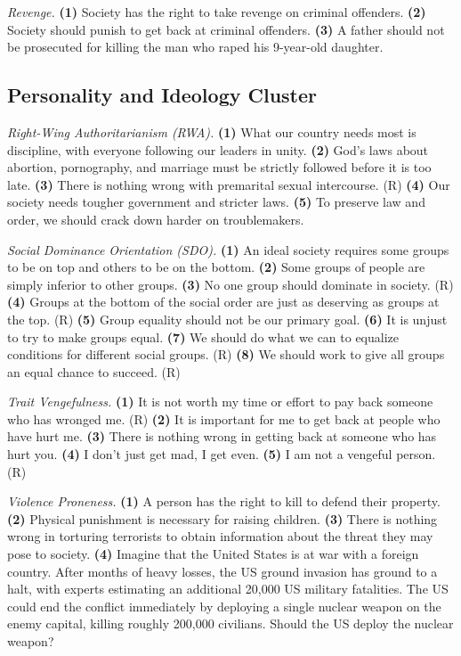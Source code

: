 \textit{Revenge.} \textbf{(1)} Society has the right to take revenge on criminal offenders. \textbf{(2)} Society should punish to get back at criminal offenders. \textbf{(3)} A father should not be prosecuted for killing the man who raped his 9-year-old daughter.

\subsection{Personality and Ideology Cluster}

\textit{Right-Wing Authoritarianism (RWA).} \textbf{(1)} What our country needs most is discipline, with everyone following our leaders in unity. \textbf{(2)} God's laws about abortion, pornography, and marriage must be strictly followed before it is too late. \textbf{(3)} There is nothing wrong with premarital sexual intercourse. (R) \textbf{(4)} Our society needs tougher government and stricter laws. \textbf{(5)} To preserve law and order, we should crack down harder on troublemakers.

\textit{Social Dominance Orientation (SDO).} \textbf{(1)} An ideal society requires some groups to be on top and others to be on the bottom. \textbf{(2)} Some groups of people are simply inferior to other groups. \textbf{(3)} No one group should dominate in society. (R) \textbf{(4)} Groups at the bottom of the social order are just as deserving as groups at the top. (R) \textbf{(5)} Group equality should not be our primary goal. \textbf{(6)} It is unjust to try to make groups equal. \textbf{(7)} We should do what we can to equalize conditions for different social groups. (R) \textbf{(8)} We should work to give all groups an equal chance to succeed. (R)

\textit{Trait Vengefulness.} \textbf{(1)} It is not worth my time or effort to pay back someone who has wronged me. (R) \textbf{(2)} It is important for me to get back at people who have hurt me. \textbf{(3)} There is nothing wrong in getting back at someone who has hurt you. \textbf{(4)} I don't just get mad, I get even. \textbf{(5)} I am not a vengeful person. (R)

\textit{Violence Proneness.} \textbf{(1)} A person has the right to kill to defend their property. \textbf{(2)} Physical punishment is necessary for raising children. \textbf{(3)} There is nothing wrong in torturing terrorists to obtain information about the threat they may pose to society. \textbf{(4)} Imagine that the United States is at war with a foreign country. After months of heavy losses, the US ground invasion has ground to a halt, with experts estimating an additional 20{,}000 US military fatalities. The US could end the conflict immediately by deploying a single nuclear weapon on the enemy capital, killing roughly 200{,}000 civilians. Should the US deploy the nuclear weapon?


